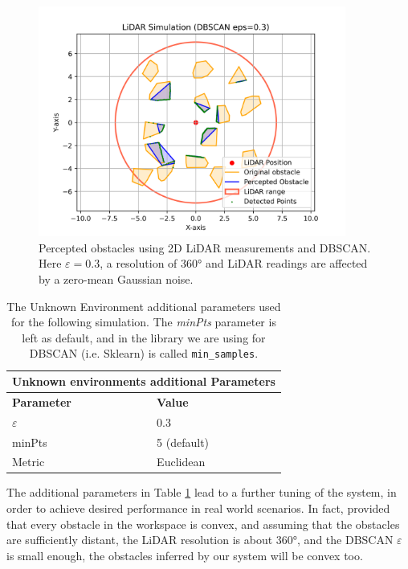 \begin{figure}[H]
    \centering
    \includegraphics[width=0.9\textwidth]{../figures/Simulations/dbscan/dbscan_and_rangefinder.png}
    \caption{Percepted obstacles using 2D LiDAR measurements and DBSCAN. Here $\varepsilon=0.3$, a resolution of 360° and LiDAR readings are affected by a zero-mean Gaussian noise.}
    \label{fig:dbscan_and_rangefinder}
\end{figure}

\begin{table}[h]
        \begin{tabular}{ |p{4cm}||p{4cm}| }
             \hline
             \multicolumn{2}{|c|}{Unknown environments additional Parameters} \\
             \hline
             \textbf{Parameter} & \textbf{Value}\\
             \hline
             $\varepsilon$ & 0.3 \\
             minPts & 5 (default) \\
             Metric & Euclidean \\
             \hline
        \end{tabular}
    \centering
    \caption{The Unknown Environment additional parameters used for the following simulation. The \textit{minPts}
        parameter is left as default, and in the library we are using for DBSCAN (i.e. Sklearn) is called \texttt{min\_samples}.}
    \label{tab:dbscan-params}
\end{table}

The additional parameters in Table \ref{tab:dbscan-params}  lead to a further tuning of the system, in order to achieve desired
performance in real world scenarios. In fact, provided that every obstacle in the workspace is convex, and assuming
that the obstacles are sufficiently distant, the LiDAR resolution is about 360°, and the
DBSCAN $\varepsilon$ is small enough, the obstacles inferred by our system will
be convex too.

